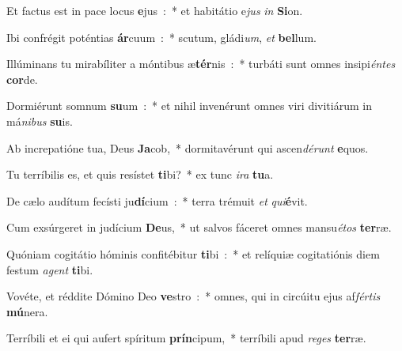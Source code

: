 ﻿\item Et factus est in pace locus \textbf{e}jus~:~* et habitátio e\emph{jus} \emph{in} \textbf{Si}on.
\item Ibi confrégit poténtias \textbf{ár}cuum~:~* scutum, gládi\emph{um}, \emph{et} \textbf{bel}lum.
\item Illúminans tu mirabíliter a móntibus æ\textbf{tér}nis~:~* turbáti sunt omnes insipi\emph{én}\emph{tes} \textbf{cor}de.
\item Dormiérunt somnum \textbf{su}um~:~* et nihil invenérunt omnes viri divitiárum in má\emph{ni}\emph{bus} \textbf{su}is.
\item Ab increpatióne tua, Deus \textbf{Ja}cob,~* dormitavérunt qui ascen\emph{dé}\emph{runt} \textbf{e}quos.
\item Tu terríbilis es, et quis resístet \textbf{ti}bi?~* ex tunc \emph{i}\emph{ra} \textbf{tu}a.
\item De cælo audítum fecísti ju\textbf{dí}cium~:~* terra trémuit \emph{et} \emph{qui}\textbf{é}vit.
\item Cum exsúrgeret in judícium \textbf{De}us,~* ut salvos fáceret omnes mansu\emph{é}\emph{tos} \textbf{ter}ræ.
\item Quóniam cogitátio hóminis confitébitur \textbf{ti}bi~:~* et relíquiæ cogitatiónis diem festum \emph{a}\emph{gent} \textbf{ti}bi.
\item Vovéte, et réddite Dómino Deo \textbf{ve}stro~:~* omnes, qui in circúitu ejus af\emph{fér}\emph{tis} \textbf{mú}nera.
\item Terríbili et ei qui aufert spíritum \textbf{prín}cipum,~* terríbili apud \emph{re}\emph{ges} \textbf{ter}ræ.
